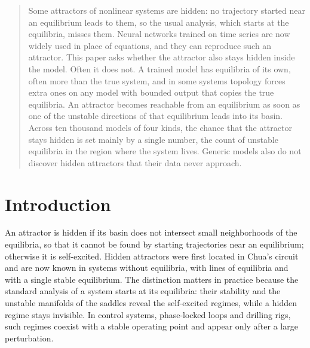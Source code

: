 \documentclass[aip,cha,reprint,amsmath,amssymb,longbibliography]{revtex4-2}
\theoremstyle{definition}
\begin{document}
\begin{quotation}
Some attractors of nonlinear systems are hidden: no trajectory started near an equilibrium leads to them, so the usual
analysis, which starts at the equilibria, misses them. Neural networks trained on time series are now widely used in place
of equations, and they can reproduce such an attractor. This paper asks whether the attractor also stays hidden inside the
model. Often it does not. A trained model has equilibria of its own, often more than the true system, and in some systems
topology forces extra ones on any model with bounded output that copies the true equilibria. An attractor becomes
reachable from an equilibrium as soon as one of the unstable directions of that equilibrium leads into its basin. Across
ten thousand models of four kinds, the chance that the attractor stays hidden is set mainly by a single number, the count
of unstable equilibria in the region where the system lives. Generic models also do not discover hidden attractors that their data never
approach.
\end{quotation}

\section{Introduction}
\label{sec:intro}

An attractor is hidden if its basin does not intersect small neighborhoods of the equilibria, so that it cannot be found
by starting trajectories near an equilibrium; otherwise it is self-excited.\cite{LeonovKuznetsov2013,Dudkowski2016} Hidden
attractors were first located in Chua's circuit\cite{Leonov2011PLA} and are now known in systems without equilibria, with
lines of equilibria and with a single stable equilibrium.\cite{Dudkowski2016,Molaie2013,JafariSprott2013,WangChen2012} The
distinction matters in practice because the standard analysis of a system starts at its equilibria: their stability and
the unstable manifolds of the saddles reveal the self-excited regimes, while a hidden regime stays invisible. In control
systems, phase-locked loops and drilling rigs, such regimes coexist with a stable operating point and appear only after a
large perturbation.\cite{Kuznetsov2020JCSSI}
\end{document}
